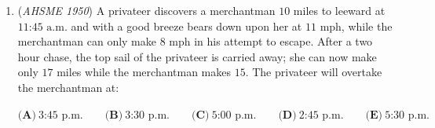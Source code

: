 \begin{enumerate}
 $\textbf{(A)}\ \text{A straight line }AB,1\frac{1}{2}\text{ inches from }A\qquad\\ \textbf{(B)}\ \text{A circle with }A\text{ as center and radius }2\text{ inches}\qquad\\ \textbf{(C)}\ \text{A circle with }A\text{ as center and radius }3\text{ inches}\qquad\\ \textbf{(D)}\ \text{A circle with radius }3\text{ inches and center }4\text{ inches from }B\text{ along }BA\qquad\\ \textbf{(E)}\ \text{An ellipse with }A\text{ as focus}$


	\item (\textit{AHSME 1950}) A privateer discovers a merchantman $10$ miles to leeward at $11\text{:}45 \text{ a.m.}$ and with a good breeze bears down upon her at $11$ mph, while the merchantman can only make $8$ mph in his attempt to escape. After a two hour chase, the top sail of the privateer is carried away; she can now make only $17$ miles while the merchantman makes $15$. The privateer will overtake the merchantman at:


 $\textbf{(A)}\ 3\text{:}45\text{ p.m.}\qquad\textbf{(B)}\ 3\text{:}30\text{ p.m.}\qquad\textbf{(C)}\ 5\text{:}00\text{ p.m.}\qquad\textbf{(D)}\ 2\text{:}45\text{ p.m.}\qquad\textbf{(E)}\ 5\text{:}30\text{ p.m.}$


\end{enumerate}
